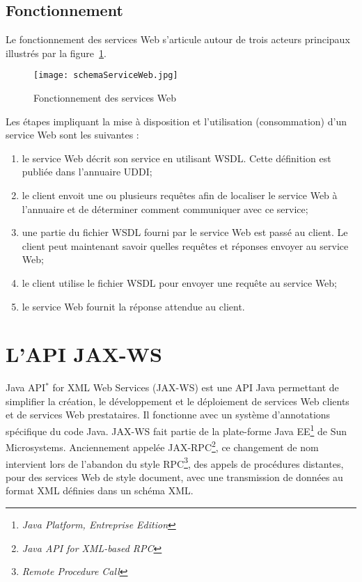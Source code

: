 \subsection{Fonctionnement}

Le fonctionnement des services Web s'articule autour de trois acteurs principaux illustr\'es par la figure~\ref{figure:schemaServiceWeb}.

\begin{figure}[!ht]
	\centering
	\texttt{[image: schemaServiceWeb.jpg]}
	\caption{Fonctionnement des services Web}
	\label{figure:schemaServiceWeb}

\end{figure}

Les \'etapes impliquant la mise \`a disposition et l'utilisation (consommation) d'un service Web sont les suivantes :

\begin{enumerate}
	\item le service Web d\'ecrit son service en utilisant WSDL. 
	Cette d\'efinition est publi\'ee dans l'annuaire UDDI;
	\item le client envoit une ou plusieurs requ\^etes afin de localiser le service Web \`a l'annuaire et de d\'eterminer comment communiquer avec ce service;
	\item une partie du fichier WSDL fourni par le service Web est pass\'e au client. 
	Le client peut maintenant savoir quelles requ\^etes et r\'eponses envoyer au service Web;
	\item le client utilise le fichier WSDL pour envoyer une requ\^ete au service Web;
	\item le service Web fournit la r\'eponse attendue au client.

\end{enumerate}

\section{L'API JAX-WS}

Java API$^*$ for XML Web Services (JAX-WS) est une API Java permettant de simplifier la cr\'eation, le d\'eveloppement et le d\'eploiement de services Web clients et de services Web prestataires.
Il fonctionne avec un syst\`eme d'annotations sp\'ecifique du code Java.
JAX-WS fait partie de la plate-forme Java EE\protect\footnote{\textit{Java Platform, Entreprise Edition}} de Sun Microsystems.
Anciennement appel\'ee JAX-RPC\protect\footnote{\textit{Java API for XML-based RPC}}, ce changement de nom intervient lors de l'abandon du style RPC\protect\footnote{\textit{Remote Procedure Call}}, des appels de proc\'edures distantes, pour des services Web de style document, avec une transmission de donn\'ees au format XML d\'efinies dans un sch\'ema XML.

